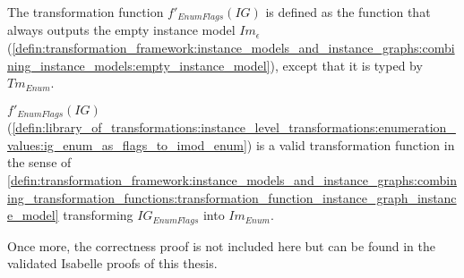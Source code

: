 \begin{defin}
\label{defin:library_of_transformations:instance_level_transformations:enumeration_values:ig_enum_as_flags_to_imod_enum}
The transformation function $f'_{EnumFlags}(IG)$ is defined as the function that always outputs the empty instance model $Im_\epsilon$ (\cref{defin:transformation_framework:instance_models_and_instance_graphs:combining_instance_models:empty_instance_model}), except that it is typed by $Tm_{Enum}$.
\end{defin}

\begin{thm}
\label{defin:library_of_transformations:instance_level_transformations:enumeration_values:ig_enum_as_flags_to_imod_enum_func}
$f'_{EnumFlags}(IG)$ (\cref{defin:library_of_transformations:instance_level_transformations:enumeration_values:ig_enum_as_flags_to_imod_enum}) is a valid transformation function in the sense of \cref{defin:transformation_framework:instance_models_and_instance_graphs:combining_transformation_functions:transformation_function_instance_graph_instance_model} transforming $IG_{EnumFlags}$ into $Im_{Enum}$.
\end{thm}

Once more, the correctness proof is not included here but can be found in the validated Isabelle proofs of this thesis.